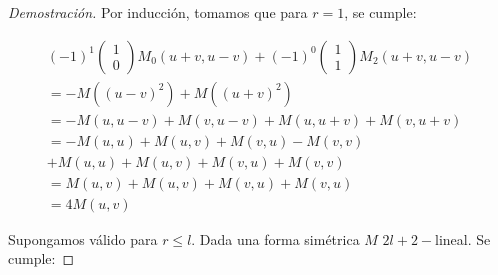 \begin{proof}[Demostración]
	Por inducción, tomamos que para $r=1$, se cumple:
	
	\begin{align*}
		(-1)^{1} \begin{pmatrix}
			1\\
			0
		\end{pmatrix} M_{0}(u+v,u-v) + (-1)^{0} \begin{pmatrix}
			1\\
			1
		\end{pmatrix} M_{2}(u+v,u-v)\\
		=-M((u-v)^{2})+M((u+v)^2) \\
		= -M(u,u-v)+M(v,u-v)  +M(u,u+v)+M(v,u+v)\\
		= -M(u,u)+M(u,v)+M(v,u)-M(v,v)\\+M(u,u)+M(u,v)+M(v,u)+M(v,v) \\
		= M(u,v)+M(u,v)+M(v,u)+M(v,u) \\
		=4M(u,v)  
	\end{align*}
	
	Supongamos válido para $r\leq l$. Dada una forma simétrica $M$ $2l+2-$lineal. Se cumple:
	

\end{proof}
